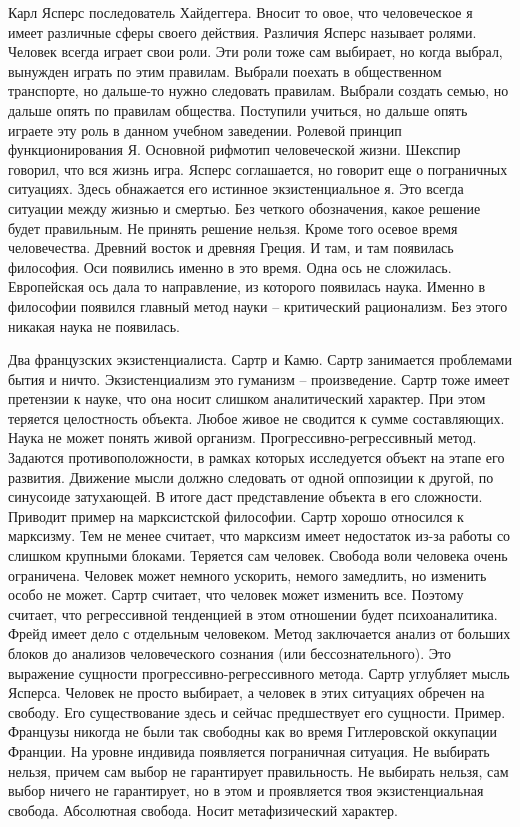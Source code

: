 \documentclass[a4paper, 12pt]{article}
\begin{document}
Карл Ясперс последователь Хайдеггера. Вносит то овое, что человеческое 
я имеет различные сферы своего действия. Различия Ясперс называет 
ролями. Человек всегда играет свои роли. Эти роли тоже сам выбирает, но 
когда выбрал, вынужден играть по этим правилам. Выбрали поехать 
в общественном транспорте, но дальше-то нужно следовать правилам. 
Выбрали создать семью, но дальше опять по правилам общества. Поступили 
учиться, но дальше опять играете эту роль в данном учебном заведении. 
Ролевой принцип функционирования Я. Основной рифмотип человеческой 
жизни. Шекспир говорил, что вся жизнь игра. Ясперс соглашается, но 
говорит еще о пограничных ситуациях. Здесь обнажается его истинное 
экзистенциальное я. Это всегда ситуации между жизнью и смертью. Без 
четкого обозначения, какое решение будет правильным. Не принять решение 
нельзя. Кроме того осевое время человечества. Древний восток и древняя 
Греция. И там, и там появилась философия. Оси появились именно в это 
время. Одна ось не сложилась. Европейская ось дала то направление, из 
которого появилась наука. Именно в философии появился главный метод 
науки -- критический рационализм. Без этого никакая наука не появилась.

Два французских экзистенциалиста. Сартр и Камю. Сартр занимается 
проблемами бытия и ничто. Экзистенциализм это гуманизм -- произведение. 
Сартр тоже имеет претензии к науке, что она носит слишком аналитический 
характер. При этом теряется целостность объекта. Любое живое не сводится 
к сумме составляющих. Наука не может понять живой организм. 
Прогрессивно-регрессивный метод. Задаются противоположности, в рамках 
которых исследуется объект на этапе его развития. Движение мысли должно 
следовать от одной оппозиции к другой, по синусоиде затухающей. В итоге 
даст представление объекта в его сложности. Приводит пример на 
марксистской философии. Сартр хорошо относился к марксизму. Тем не менее 
считает, что марксизм имеет недостаток из-за работы со слишком крупными 
блоками. Теряется сам человек. Свобода воли человека очень ограничена. 
Человек может немного ускорить, немого замедлить, но изменить особо не 
может. Сартр считает, что человек может изменить все. Поэтому считает, 
что регрессивной тенденцией в этом отношении будет психоаналитика. Фрейд 
имеет дело с отдельным человеком. Метод заключается анализ от больших 
блоков до анализов человеческого сознания (или бессознательного). Это 
выражение сущности прогрессивно-регрессивного метода. Сартр углубляет 
мысль Ясперса. Человек не просто выбирает, а человек в этих ситуациях 
обречен на свободу. Его существование здесь и сейчас предшествует его 
сущности. Пример. Французы никогда не были так свободны как во время 
Гитлеровской оккупации Франции. На уровне индивида появляется 
пограничная ситуация. Не выбирать нельзя, причем сам выбор не 
гарантирует правильность. Не выбирать нельзя, сам выбор ничего не 
гарантирует, но в этом и проявляется твоя экзистенциальная свобода. 
Абсолютная свобода. Носит метафизический характер.
\end{document}
